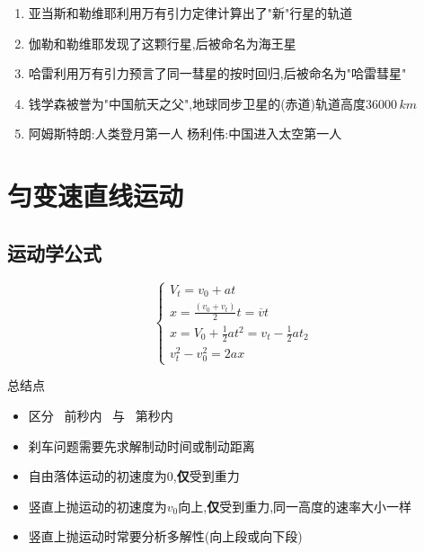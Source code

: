\documentclass{article}
\begin{document}
\begin{enumerate}
\begin{adjustbox}{minipage=0.86\linewidth, bgcolor=gray!20, padding=1em}
              \vspace{-1em}

              $$ \theta \propto \text{力矩} \quad \lra  \quad k\theta = 2F_{G}L \quad (k\text{为比例系数需提前测量}) $$
          \end{adjustbox}

          \vspace{-1em}

    \item 亚当斯和勒维耶利用万有引力定律计算出了"新"行星的轨道
    \item 伽勒和勒维耶发现了这颗行星,后被命名为海王星
    \item 哈雷利用万有引力预言了同一彗星的按时回归,后被命名为"哈雷彗星"
    \item 钱学森被誉为"中国航天之父",地球同步卫星的(赤道)轨道高度$36000 \,km$
    \item 阿姆斯特朗:人类登月第一人 \quad 杨利伟:中国进入太空第一人
\end{enumerate}

\vspace{2em}

\newpage

\section{匀变速直线运动}

\subsection{运动学公式}
$$
    \begin{cases}
        V_{t} = v_{0} + at                                        \\

        x = \frac{(v_{0} + v_{t})}{2} t = \overline{v} t          \\

        x = V_{0} + \frac{1}{2}at^{2} = v_{t} - \frac{1}{2}at_{2} \\

        v_{t}^{2} - v_{0}^{2} = 2ax
    \end{cases}
$$

总结点

\begin{itemize}
    \item 区分 \, 前秒内 \, 与 \, 第秒内 \,
    \item 刹车问题需要先求解制动时间或制动距离
    \item 自由落体运动的初速度为$0$,\textbf{仅}受到重力
    \item 竖直上抛运动的初速度为$v_{0}$向上,\textbf{仅}受到重力,同一高度的速率大小一样
    \item 竖直上抛运动时常要分析多解性(向上段或向下段)
\end{itemize}
\end{document}
